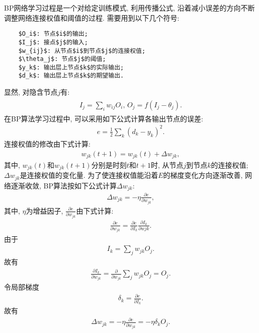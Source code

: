 BP网络学习过程是一个对给定训练模式, 利用传播公式, 沿着减小误差的方向不断调整网络连接权值和阈值的过程. 需要用到以下几个符号:
\begin{Verbatim}
    $O_i$: 节点$i$的输出;
    $I_j$: 接点$j$的输入;
    $w_{ij}$: 从节点$i$到节点$j$的连接权值;
    $\theta_j$: 节点$j$的阈值;
    $y_k$: 输出层上节点$k$的实际输出;
    $d_k$: 输出层上节点$k$的期望输出.
\end{Verbatim}

显然, 对隐含节点$j$有:
\begin{align*}
  \begin{array}{l}
        I_{j}=\sum_{i} w_{i j} O_{i},\, O_{j}=f\left (I_{j}-\theta_{j}\right).
  \end{array}
\end{align*}
在BP算法学习过程中, 可以采用如下公式计算各输出节点的误差:
\begin{align*}
    e=\frac{1}{2} \sum_{k}\left (d_{k}-y_{k}\right)^{2}.
\end{align*}
连接权值的修改由下式计算:
\begin{align*}
    w_{j k} (t+1)=w_{j k} (t)+\Delta w_{j k},
\end{align*}
其中, $w_{jk} (t)$和$w_{jk} (t+1)$分别是时刻$t$和$t+1$时, 从节点$j$到节点$k$的连接权值; $\Delta w_{jk}$是连接权值的变化量.
为了使连接权值能沿着$E$的梯度变化方向逐渐改善, 网络逐渐收敛, BP算法按如下公式计算$\Delta w_{jk}$:
\begin{align*}
    \Delta w_{j k}=-\eta \frac{\partial e}{\partial w_{j k}},
\end{align*}
其中, $\eta$为增益因子, $\frac{\partial e}{\partial w_{j k}}$由下式计算:
\begin{align*}
    \frac{\partial e}{\partial w_{j k}}=\frac{\partial e}{\partial I_{k}} \frac{\partial I_{k}}{\partial w j k}.
\end{align*}
由于
\begin{align*}
    I_{k}=\sum_{j} w_{j k} O_{j}.
\end{align*}
故有
\begin{align*}
    \frac{\partial I_{k}}{\partial w_{j k}}=\frac{\partial}{\partial w_{j k}} \sum_{j} w_{j k} O_{j}=O_{j}.
\end{align*}
令局部梯度
\begin{align*}
    \delta_{k}=\frac{\partial e}{\partial I_{k}}.
\end{align*}
故有
\begin{align*}
    \Delta w_{j k}=-\eta \frac{\partial e}{\partial w_{j k}}=-\eta \delta_{k} O_{j}.
\end{align*}

